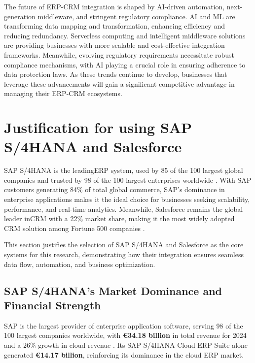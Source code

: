 The future of ERP-CRM integration is shaped by AI-driven automation, next-generation middleware, and stringent regulatory compliance. AI and ML are transforming data mapping and transformation, enhancing efficiency and reducing redundancy. Serverless computing and intelligent middleware solutions are providing businesses with more scalable and cost-effective integration frameworks. Meanwhile, evolving regulatory requirements necessitate robust compliance mechanisms, with AI playing a crucial role in ensuring adherence to data protection laws. As these trends continue to develop, businesses that leverage these advancements will gain a significant competitive advantage in managing their ERP-CRM ecosystems.







\section{Justification for using SAP S/4HANA and Salesforce}


SAP S/4HANA is the leadingERP system, used by 85 of the 100 largest global companies and trusted by 98 of the 100 largest enterprises worldwide \cite{sap_2025}. With SAP customers generating 84\% of total global commerce, SAP’s dominance in enterprise applications makes it the ideal choice for businesses seeking scalability, performance, and real-time analytics. Meanwhile, Salesforce remains the global leader inCRM with a 22\% market share, making it the most widely adopted CRM solution among Fortune 500 companies \cite{statista_2023a}.

This section justifies the selection of SAP S/4HANA and Salesforce as the core systems for this research, demonstrating how their integration ensures seamless data flow, automation, and business optimization.

\subsection{SAP S/4HANA’s Market Dominance and Financial Strength}
SAP is the largest provider of enterprise application software, serving 98 of the 100 largest companies worldwide, with \textbf{€34.18 billion} in total revenue for 2024 and a 26\% growth in cloud revenue \cite{sap_2025}. Its SAP S/4HANA Cloud ERP Suite alone generated \textbf{€14.17 billion}, reinforcing its dominance in the cloud ERP market.

